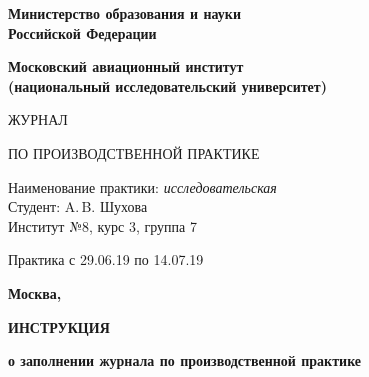 \documentclass[dvipsnames,pdf, unicode, 12pt, a4paper, oneside, fleqn]{article}
\begin{document}
\begin{titlepage}
\begin{center}
\bfseries{\Large Министерство образования и науки\\Российской Федерации}

\vspace{12pt}

\bfseries{\Large Московский авиационный институт\\ (национальный исследовательский университет)}

\vspace{48pt}



\vspace{36pt}



\vspace{48pt}

{\huge ЖУРНАЛ}

\vspace{12pt}

{\large ПО ПРОИЗВОДСТВЕННОЙ ПРАКТИКЕ}


\end{center}

\vspace{72pt}

\begin{flushleft}
Наименование практики: {\itshape исследовательская}\\
Студент: A.\,B. Шухова \\
Институт №8, курс 3, группа 7 \\
\end{flushleft}

\vspace{12pt}

\begin{flushleft}
Практика с 29.06.19 по 14.07.19
\end{flushleft}

\vfill

\begin{center}
\bfseries Москва, \the\year
\end{center}
\end{titlepage}

\pagebreak

\begin{center}
\bfseries{\large ИНСТРУКЦИЯ }

\vspace{12pt}

\bfseries{о заполнении журнала по производственной практике}
\end{center}
\end{document}

